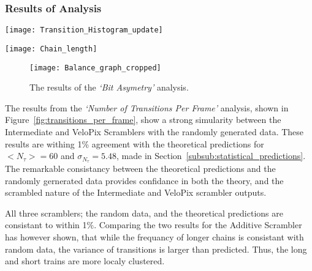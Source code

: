 		\subsubsection{Results of Analysis}
		\label{subsub:algorithm_results}
			\begin{SCfigure}%
				\centering
				\texttt{[image: Transition\_Histogram\_update]}
				\caption{Results of the \textit{`Number of Transitions Per Frame'} analysis. The results for the Random Data, Intermediate Scrambler and VeloPix Scrambler overlap for the \textit{`Number of Transitions Per Frame'} analysis.}
				\label{fig:transitions_per_frame}
			\end{SCfigure}
			\par
			\begin{SCfigure}%
				\centering
				\texttt{[image: Chain\_length]}
				\caption{Results of the \textit{`Common Bit Chain Length'} analysis. The results for the Random Data, Additive Scrambler, Intermediate Scrambler and VeloPix Scrambler approximatly overlap for the \textit{`Common Bit Chain Length'} analysis.}
				\label{fig:chain_length}
			\end{SCfigure}
			\par
			\begin{figure}[ht]
				\centering
				\texttt{[image: Balance\_graph\_cropped]}
				\caption{The results of the \textit{`Bit Asymetry'} analysis.}
				\label{fig:bit_asym}
			\end{figure}

			The results from the \textit{`Number of Transitions Per Frame'} analysis, shown in Figure~\ref{fig:transitions_per_frame}, show a strong simularity between the Intermediate and VeloPix Scramblers with the randomly generated data. 
			These results are withing 1\% agreement with the theoretical predictions for $<N_\tau> = 60$ and $\sigma_{N_\tau} = 5.48$, made in Section~\ref{subsub:statistical_predictions}. 
			The remarkable consistancy between the theoretical predictions and the randomly gernerated data provides confidance in both the theory, and the scrambled nature of the Intermediate and VeloPix scrambler outputs.
			
			All three scramblers; the random data, and the theoretical predictions are consistant to within 1\%. 
			Comparing the two results for the Additive Scrambler has however shown, that while the frequancy of longer chains is consistant with random data, the variance of transitions is larger than predicted. Thus, the long and short trains are more localy clustered. 
			
